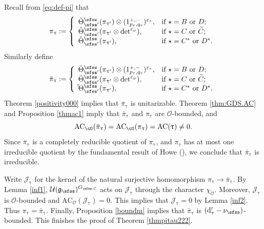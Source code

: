 \documentclass[11pt,a4paper]{amsart}
\newcommand{\CJ}{{\mathcal {J}}}
\newcommand{\CO}{{\mathcal {O}}}
\newcommand{\CU}{{\mathcal {U}}}
\newcommand{\g}{\mathfrak g}
\numberwithin{equation}{section}
\theoremstyle{remark}
\def\Thetab{\bar{\Theta}}
\begin{document}
Recall from \eqref{eq:def-pi} that
\[
    \pi_{\uptau}:=\left\{
     \begin{array}{ll}
         \check \Theta_{\sfss'}^{\sfss}(\pi_{\uptau'})\otimes (1_{p_\tau, q_\tau}^{+,-})^{\varepsilon_{\tau}}, &\hbox{if  $\star=B$ or $D$}; \\
         \check \Theta_{\sfss'}^{\sfss}(\pi_{\uptau'}\otimes \det^{\varepsilon_{\wp}}), &\hbox{if $\star=C$ or $\widetilde C$}; \\
              \check \Theta_{\sfss'}^{\sfss}(\pi_{\uptau'}), &\hbox{if $\star=C^*$ or $D^*$}. \\
            \end{array}
   \right.
\]
Similarly define
\[
   \bar \pi_{\uptau}:=\left\{
     \begin{array}{ll}
         \Thetab_{\sfss'}^{\sfss}(\pi_{\uptau'})\otimes (1_{p_\tau, q_\tau}^{+,-})^{\varepsilon_{\tau}}, &\hbox{if  $\star=B$ or $D$}; \\
          \Thetab_{\sfss'}^{\sfss}(\pi_{\uptau'}\otimes \det^{\varepsilon_{\wp}}), &\hbox{if $\star=C$ or $\widetilde C$}; \\
              \check \Thetab_{\sfss'}^{\sfss}(\pi_{\uptau'}), &\hbox{if $\star=C^*$ or $D^*$}. \\
            \end{array}
   \right.
\]
Theorem \ref{positivity000} implies that
$\bar \pi_{\uptau}$ is unitarizable.  Theorem \ref{thm:GDS.AC} and Proposition \ref{thmac1} imply that $\bar \pi_{\uptau}$ and $\pi_{\uptau}$ are $\CO$-bounded, and
\[
    \mathrm{AC}_{\cO}( \bar \pi_{\uptau})=\mathrm{AC}_{\cO}(\pi_{\uptau})=\mathrm{AC}(\uptau)\neq 0.
\]
Since $\bar \pi_{\uptau}$ is a completely reducible quotient of $\pi_{\uptau}$, and $\pi_{\uptau}$ has at most one  irreducible quotient by the fundamental result of Howe (\cite[Theorem 1A]{Howe89}), we conclude that $\bar \pi_{\uptau}$ is irreducible.

Write
$\CJ_\uptau$ for the kernel of the natural surjective homomorphism $\pi_{\uptau}\rightarrow \bar \pi_{\uptau}$. By Lemma \ref{inf1},  $\CU(\g_\sfss)^{G_{\sfss, \C}}$ acts on $\CJ_{\uptau}$ through the character $\chi_{\check \CO}$. Moreover, $\CJ_\uptau$  is $\CO$-bounded and  $\mathrm{AC}_{\CO}(\CJ_{\uptau})=0$. This implies that $\CJ_{\uptau}=0$ by Lemma \ref{inf2}.
Thus $\pi_{\uptau}=\bar \pi_{\uptau}$. Finally, Proposition \ref{boundm} implies that  $\bar \pi_{\uptau}$ is $(\mathrm d'_\tau-\nu_{\sfss})$-bounded. This finishes the proof of Theorem
\ref{thmpitau222}.
\end{document}
